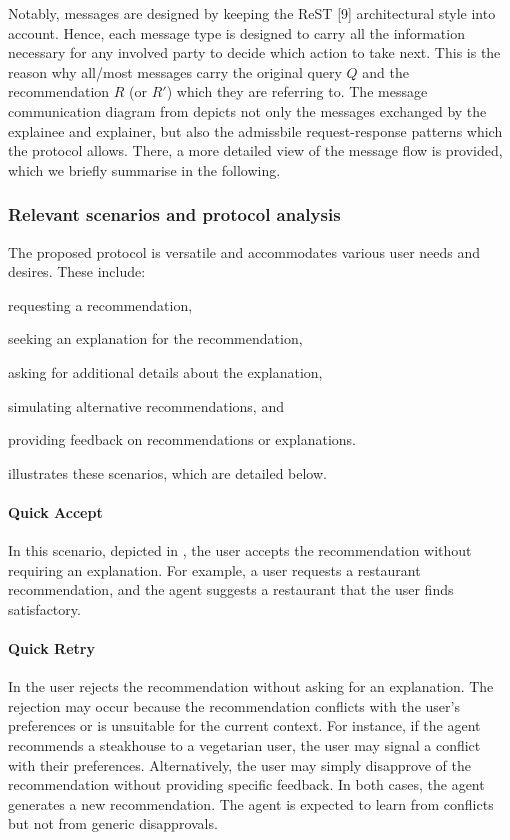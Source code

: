 Notably, messages are designed by keeping the \gls{ReST} [9] architectural style into account.
%
Hence, each message type is designed to carry all the information necessary for any involved party to decide which action to take next.
%
This is the reason why all/most messages carry the original query $Q$ and the recommendation $R$ (or $R'$) which they are referring to.
%
The message communication diagram from  depicts not only the messages exchanged by the explainee and explainer, but also the admissbile request-response patterns which the protocol allows.
%
There, a more detailed view of the message flow is provided, which we briefly summarise in the following.


\subsubsection{Relevant scenarios and protocol analysis}\label{subsubsec:relevant-scenarios}
%

%
The proposed protocol is versatile and accommodates various user needs and desires.
%
These include:
%
\begin{inlinelist}
    \item requesting a recommendation,
    \item seeking an explanation for the recommendation,
    \item asking for additional details about the explanation,
    \item simulating alternative recommendations, and
    \item providing feedback on recommendations or explanations.
\end{inlinelist}
%
 illustrates these scenarios, which are detailed below.

%
\paragraph{Quick Accept}
%
In this scenario, depicted in , the user accepts the recommendation without requiring an explanation.
%
For example, a user requests a restaurant recommendation, and the agent suggests a restaurant that the user finds satisfactory.

%
\paragraph{Quick Retry}
%
In  the user rejects the recommendation without asking for an explanation.
%
The rejection may occur because the recommendation conflicts with the user's preferences or is unsuitable for the current context.
%
For instance, if the agent recommends a steakhouse to a vegetarian user, the user may signal a conflict with their preferences.
%
Alternatively, the user may simply disapprove of the recommendation without providing specific feedback.
%
In both cases, the agent generates a new recommendation.
%
The agent is expected to learn from conflicts but not from generic disapprovals.

